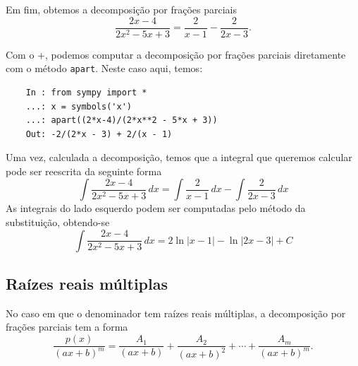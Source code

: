 \begin{ex}
  Em fim, obtemos a decomposição por frações parciais
  \begin{equation}
    \frac{2x-4}{2x^2 - 5x + 3} = \frac{2}{x-1} - \frac{2}{2x-3}.
  \end{equation}

  \ifispython
  Com o {\python}+{\sympy}, podemos computar a decomposição por frações parciais diretamente com o método \lstinline+apart+. Neste caso aqui, temos:
  \begin{lstlisting}
    In : from sympy import *
    ...: x = symbols('x')
    ...: apart((2*x-4)/(2*x**2 - 5*x + 3))
    Out: -2/(2*x - 3) + 2/(x - 1)
  \end{lstlisting}
  \fi

  Uma vez, calculada a decomposição, temos que a integral que queremos calcular pode ser reescrita da seguinte forma
  \begin{equation}
    \int\frac{2x-4}{2x^2 - 5x + 3}\,dx = \int\frac{2}{x-1}\,dx - \int\frac{2}{2x-3}\,dx
  \end{equation}
  As integrais do lado esquerdo podem ser computadas pelo método da substituição, obtendo-se
  \begin{equation}
    \int\frac{2x-4}{2x^2 - 5x + 3}\,dx = 2\ln|x-1| - \ln|2x-3| + C
  \end{equation}
\end{ex}

\subsection{Raízes reais múltiplas}

No caso em que o denominador tem raízes reais múltiplas, a decomposição por frações parciais tem a forma
\begin{equation}
  \frac{p(x)}{(ax+b)^m} = \frac{A_1}{(ax+b)} + \frac{A_2}{(ax+b)^2} + \cdots + \frac{A_m}{(ax+b)^m}. 
\end{equation}

